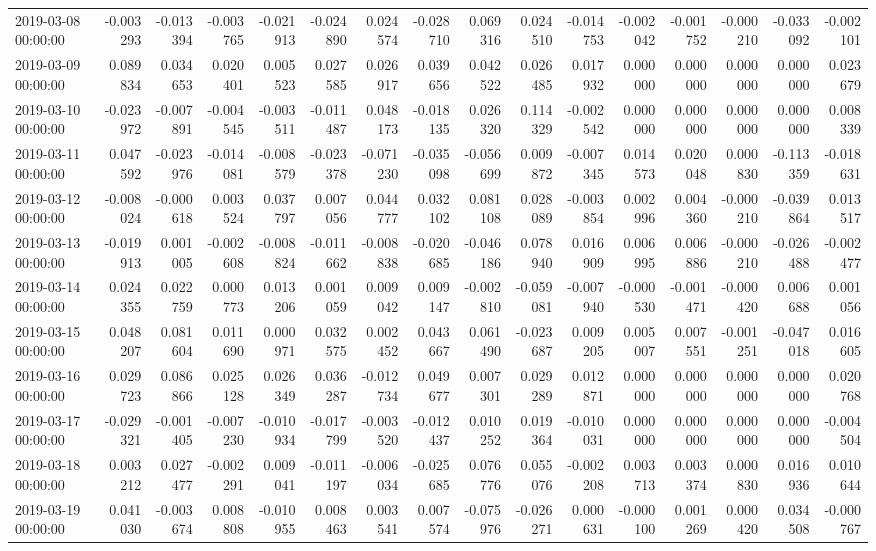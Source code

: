 \begin{tabular}{lrrrrrrrrrrrrrrr}
2019-03-08 00:00:00 & -0.003293 & -0.013394 & -0.003765 & -0.021913 & -0.024890 & 0.024574 & -0.028710 & 0.069316 & 0.024510 & -0.014753 & -0.002042 & -0.001752 & -0.000210 & -0.033092 & -0.002101 \\
2019-03-09 00:00:00 & 0.089834 & 0.034653 & 0.020401 & 0.005523 & 0.027585 & 0.026917 & 0.039656 & 0.042522 & 0.026485 & 0.017932 & 0.000000 & 0.000000 & 0.000000 & 0.000000 & 0.023679 \\
2019-03-10 00:00:00 & -0.023972 & -0.007891 & -0.004545 & -0.003511 & -0.011487 & 0.048173 & -0.018135 & 0.026320 & 0.114329 & -0.002542 & 0.000000 & 0.000000 & 0.000000 & 0.000000 & 0.008339 \\
2019-03-11 00:00:00 & 0.047592 & -0.023976 & -0.014081 & -0.008579 & -0.023378 & -0.071230 & -0.035098 & -0.056699 & 0.009872 & -0.007345 & 0.014573 & 0.020048 & 0.000830 & -0.113359 & -0.018631 \\
2019-03-12 00:00:00 & -0.008024 & -0.000618 & 0.003524 & 0.037797 & 0.007056 & 0.044777 & 0.032102 & 0.081108 & 0.028089 & -0.003854 & 0.002996 & 0.004360 & -0.000210 & -0.039864 & 0.013517 \\
2019-03-13 00:00:00 & -0.019913 & 0.001005 & -0.002608 & -0.008824 & -0.011662 & -0.008838 & -0.020685 & -0.046186 & 0.078940 & 0.016909 & 0.006995 & 0.006886 & -0.000210 & -0.026488 & -0.002477 \\
2019-03-14 00:00:00 & 0.024355 & 0.022759 & 0.000773 & 0.013206 & 0.001059 & 0.009042 & 0.009147 & -0.002810 & -0.059081 & -0.007940 & -0.000530 & -0.001471 & -0.000420 & 0.006688 & 0.001056 \\
2019-03-15 00:00:00 & 0.048207 & 0.081604 & 0.011690 & 0.000971 & 0.032575 & 0.002452 & 0.043667 & 0.061490 & -0.023687 & 0.009205 & 0.005007 & 0.007551 & -0.001251 & -0.047018 & 0.016605 \\
2019-03-16 00:00:00 & 0.029723 & 0.086866 & 0.025128 & 0.026349 & 0.036287 & -0.012734 & 0.049677 & 0.007301 & 0.029289 & 0.012871 & 0.000000 & 0.000000 & 0.000000 & 0.000000 & 0.020768 \\
2019-03-17 00:00:00 & -0.029321 & -0.001405 & -0.007230 & -0.010934 & -0.017799 & -0.003520 & -0.012437 & 0.010252 & 0.019364 & -0.010031 & 0.000000 & 0.000000 & 0.000000 & 0.000000 & -0.004504 \\
2019-03-18 00:00:00 & 0.003212 & 0.027477 & -0.002291 & 0.009041 & -0.011197 & -0.006034 & -0.025685 & 0.076776 & 0.055076 & -0.002208 & 0.003713 & 0.003374 & 0.000830 & 0.016936 & 0.010644 \\
2019-03-19 00:00:00 & 0.041030 & -0.003674 & 0.008808 & -0.010955 & 0.008463 & 0.003541 & 0.007574 & -0.075976 & -0.026271 & 0.000631 & -0.000100 & 0.001269 & 0.000420 & 0.034508 & -0.000767 \\

\end{tabular}
